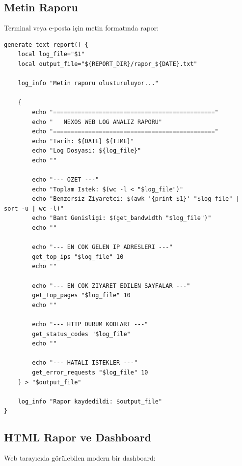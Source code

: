 \documentclass[12pt,a4paper]{report}
\begin{document}
\subsection{Metin Raporu}

Terminal veya e-posta için metin formatında rapor:

\begin{lstlisting}[style=bashstyle,caption={Metin Rapor Uretimi}]
generate_text_report() {
    local log_file="$1"
    local output_file="${REPORT_DIR}/rapor_${DATE}.txt"
    
    log_info "Metin raporu olusturuluyor..."
    
    {
        echo "=============================================="
        echo "   NEXOS WEB LOG ANALIZ RAPORU"
        echo "=============================================="
        echo "Tarih: ${DATE} ${TIME}"
        echo "Log Dosyasi: ${log_file}"
        echo ""
        
        echo "--- OZET ---"
        echo "Toplam Istek: $(wc -l < "$log_file")"
        echo "Benzersiz Ziyaretci: $(awk '{print $1}' "$log_file" | sort -u | wc -l)"
        echo "Bant Genisligi: $(get_bandwidth "$log_file")"
        echo ""
        
        echo "--- EN COK GELEN IP ADRESLERI ---"
        get_top_ips "$log_file" 10
        echo ""
        
        echo "--- EN COK ZIYARET EDILEN SAYFALAR ---"
        get_top_pages "$log_file" 10
        echo ""
        
        echo "--- HTTP DURUM KODLARI ---"
        get_status_codes "$log_file"
        echo ""
        
        echo "--- HATALI ISTEKLER ---"
        get_error_requests "$log_file" 10
    } > "$output_file"
    
    log_info "Rapor kaydedildi: $output_file"
}
\end{lstlisting}

\subsection{HTML Rapor ve Dashboard}

Web tarayıcıda görülebilen modern bir dashboard:
\end{document}
